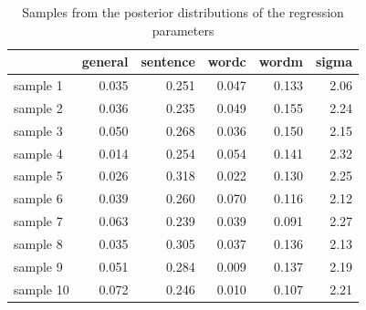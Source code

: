 \documentclass[11pt,a4paper,twoside]{book}
\newenvironment{knitrout}{}{} %
\begin{document}
\begin{knitrout}
\color{fgcolor}\begin{table}

\caption{\label{tab:empirical.data.postsample2}Samples from the posterior distributions of the regression parameters}
\centering
\begin{tabular}[t]{lrrrrr}
\toprule
  & general & sentence & wordc & wordm & sigma\\
\midrule
sample 1 & 0.035 & 0.251 & 0.047 & 0.133 & 2.06\\
sample 2 & 0.036 & 0.235 & 0.049 & 0.155 & 2.24\\
sample 3 & 0.050 & 0.268 & 0.036 & 0.150 & 2.15\\
sample 4 & 0.014 & 0.254 & 0.054 & 0.141 & 2.32\\
sample 5 & 0.026 & 0.318 & 0.022 & 0.130 & 2.25\\
sample 6 & 0.039 & 0.260 & 0.070 & 0.116 & 2.12\\
sample 7 & 0.063 & 0.239 & 0.039 & 0.091 & 2.27\\
sample 8 & 0.035 & 0.305 & 0.037 & 0.136 & 2.13\\
sample 9 & 0.051 & 0.284 & 0.009 & 0.137 & 2.19\\
sample 10 & 0.072 & 0.246 & 0.010 & 0.107 & 2.21\\
\bottomrule
\end{tabular}
\end{table}


\end{knitrout}
\end{document}
